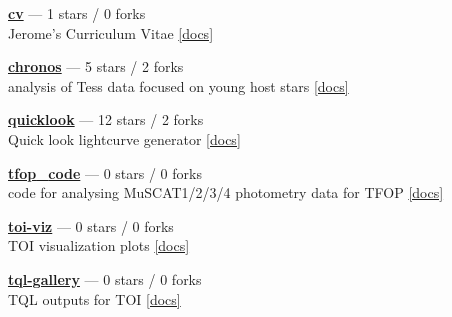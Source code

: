 \item \href{https://github.com/jpdeleon/cv}{{\bf cv}} --- 1 stars / 0 forks \\
Jerome's Curriculum Vitae \href{https://raw.githubusercontent.com/jpdeleon/cv/main-pdf/tex/cv_pubs.pdf}{[docs]}

\item \href{https://github.com/jpdeleon/chronos}{{\bf chronos}} --- 5 stars / 2 forks \\
analysis of Tess data focused on young host stars \href{None}{[docs]}

\item \href{https://github.com/jpdeleon/quicklook}{{\bf quicklook}} --- 12 stars / 2 forks \\
Quick look lightcurve generator \href{None}{[docs]}

\item \href{https://github.com/jpdeleon/tfop_code}{{\bf tfop{\_}code}} --- 0 stars / 0 forks \\
code for analysing MuSCAT1/2/3/4 photometry data for TFOP \href{None}{[docs]}

\item \href{https://github.com/jpdeleon/toi-viz}{{\bf toi-viz}} --- 0 stars / 0 forks \\
TOI visualization plots \href{None}{[docs]}

\item \href{https://github.com/jpdeleon/tql-gallery}{{\bf tql-gallery}} --- 0 stars / 0 forks \\
TQL outputs for TOI \href{None}{[docs]}